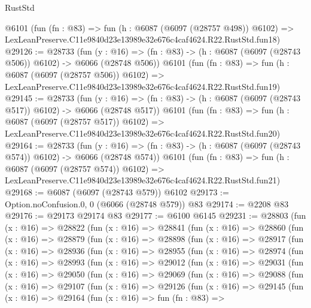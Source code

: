 \begin{lexlean}{RustStd}
\begin{coremodule}
    @6101
    (fun (fn : @83) =>
    fun (h : @6087 (@6097 (@28757 @498)) @6102) =>
    LexLeanPreserve.C11e9840d23e13989e32e676c4caf4624.R22.RustStd.fun18)
@29126 := @28733
    (fun (y : @16) => (fn : @83) -> (h : @6087 (@6097 (@28743 @506)) @6102) -> @6066 (@28748 @506))
    @6101
    (fun (fn : @83) =>
    fun (h : @6087 (@6097 (@28757 @506)) @6102) =>
    LexLeanPreserve.C11e9840d23e13989e32e676c4caf4624.R22.RustStd.fun19)
@29145 := @28733
    (fun (y : @16) => (fn : @83) -> (h : @6087 (@6097 (@28743 @517)) @6102) -> @6066 (@28748 @517))
    @6101
    (fun (fn : @83) =>
    fun (h : @6087 (@6097 (@28757 @517)) @6102) =>
    LexLeanPreserve.C11e9840d23e13989e32e676c4caf4624.R22.RustStd.fun20)
@29164 := @28733
    (fun (y : @16) => (fn : @83) -> (h : @6087 (@6097 (@28743 @574)) @6102) -> @6066 (@28748 @574))
    @6101
    (fun (fn : @83) =>
    fun (h : @6087 (@6097 (@28757 @574)) @6102) =>
    LexLeanPreserve.C11e9840d23e13989e32e676c4caf4624.R22.RustStd.fun21)
@29168 := @6087 (@6097 (@28743 @579)) @6102
@29173 := Option.noConfusion.{0, 0} (@6066 (@28748 @579)) @83
@29174 := @2208 @83
@29176 := @29173 @29174 @83
@29177 := @6100 @6145
@29231 := @28803
    (fun (x : @16) =>
    @28822
      (fun (x : @16) =>
      @28841
        (fun (x : @16) =>
        @28860
          (fun (x : @16) =>
          @28879
            (fun (x : @16) =>
            @28898
              (fun (x : @16) =>
              @28917
                (fun (x : @16) =>
                @28936
                  (fun (x : @16) =>
                  @28955
                    (fun (x : @16) =>
                    @28974
                      (fun (x : @16) =>
                      @28993
                        (fun (x : @16) =>
                        @29012
                          (fun (x : @16) =>
                          @29031
                            (fun (x : @16) =>
                            @29050
                              (fun (x : @16) =>
                              @29069
                                (fun (x : @16) =>
                                @29088
                                  (fun (x : @16) =>
                                  @29107
                                    (fun (x : @16) =>
                                    @29126
                                      (fun (x : @16) =>
                                      @29145
                                        (fun (x : @16) =>
                                        @29164
                                          (fun (x : @16) =>
                                          fun (fn : @83) =>

\end{coremodule}
\end{lexlean}
